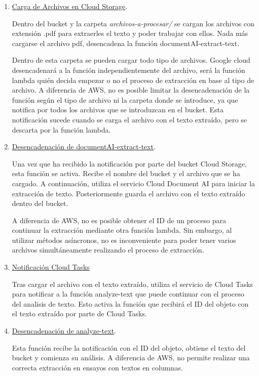 \begin{enumerate}
    \item \underline{Carga de Archivos en Cloud Storage}. 
    
    Dentro del bucket y la carpeta \textit{archivos-a-procesar/} se cargan los archivos con extensión .pdf para extraerles el texto y poder trabajar con ellos. Nada más cargarse el archivo pdf, desencadena la función documentAI-extract-text. 

    Dentro de esta carpeta se pueden cargar todo tipo de archivos. Google cloud desencadenará a la función independientemente del archivo, será la función lambda quién decida empezar o no el proceso de extracción en base al tipo de archivo. A diferencia de AWS, no es posible limitar la desencadenación de la función según el tipo de archivo ni la carpeta donde se introduce, ya que notifica por todos los archivos que se introduzcan en el bucket. Esta notificación sucede cuando se carga el archivo con el texto extraído, pero se descarta por la función lambda.
    
    \item \underline{Desencadenación de documentAI-extract-text}. 
    
    Una vez que ha recibido la notificación por parte del bucket Cloud Storage, esta función se activa. Recibe el nombre del bucket y el archivo que se ha cargado. A continuación, utiliza el servicio Cloud Document AI para iniciar la extracción de texto. Posteriormente guarda el archivo con el texto extraído dentro del bucket. 

    A diferencia de AWS, no es posible obtener el ID de un proceso para continuar la extracción mediante otra función lambda. Sin embargo, al utilizar métodos asíncronos, no es inconveniente para poder tener varios archivos simultáneamente realizando el proceso de extracción. 
    
    \item \underline{Notificación Cloud Tasks}
    
    Tras cargar el archivo con el texto extraído, utiliza el servicio de Cloud Tasks para notificar a la función analyze-text que puede continuar con el proceso del analisis de texto. Esto activa la función que recibirá el ID del objeto con el texto extraído por parte de Cloud Tasks.

    \item \underline{Desencadenación de analyze-text}.

    Esta función recibe la notificación con el ID del objeto, obtiene el texto del bucket y comienza su análisis. A diferencia de AWS, no permite realizar una correcta extracción en ensayos con textos en columnas.


\end{enumerate}
